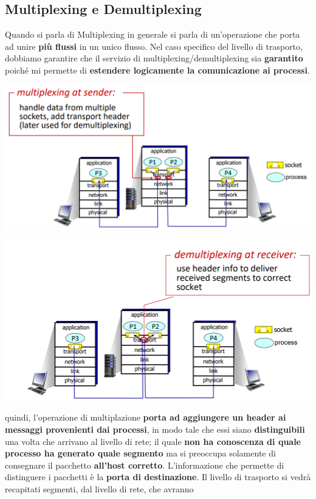 \documentclass[12pt]{article}
\begin{document}
\subsection{Multiplexing e Demultiplexing}
Quando si parla di Multiplexing in generale si parla di un'operazione che porta ad unire \textbf{più flussi} in un unico flusso.
Nel caso specifico del livello di trasporto, dobbiamo garantire che il servizio di multiplexing/demultiplexing sia \textbf{garantito} poiché mi permette
di \textbf{estendere logicamente la comunicazione ai processi}. 
\begin{center}
    \includegraphics[width = 0.90\linewidth]{Images/39.png}
\end{center}
\begin{center}
    \includegraphics[width = 0.90\linewidth]{Images/40.png}
\end{center}
quindi, l'operazione di multiplazione \textbf{porta ad aggiungere un header ai messaggi provenienti dai processi}, in modo tale che essi siano \textbf{distinguibili} una volta che arrivano al livello di rete; il quale \textbf{non ha conoscenza di quale processo ha generato quale segmento}
ma si preoccupa solamente di consegnare il pacchetto \textbf{all'host corretto}. L'informazione che permette di distinguere i pacchetti è la \textbf{porta di destinazione}. Il livello di trasporto si vedrà recapitati segmenti, dal livello di rete, che avranno
\end{document}
